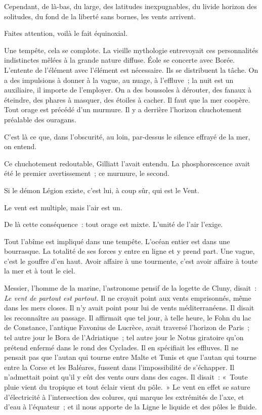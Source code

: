 \documentclass[french,twoside]{book} %
\begin{document}
Cependant, de là-bas, du large, des latitudes inexpugnables, du livide horizon des solitudes, du fond de la liberté sans bornes, les vents arrivent.\par
Faites attention, voilà le fait équinoxial.\par
Une tempête, cela se complote. La vieille mythologie entrevoyait ces personnalités indistinctes mêlées à la grande nature diffuse. Éole se concerte avec Borée.  L’entente de l’élément avec l’élément est nécessaire. Ils se distribuent la tâche. On a des impulsions à donner à la vague, au nuage, à l’effluve ; la nuit est un auxiliaire, il importe de l’employer. On a des boussoles à dérouter, des fanaux à éteindre, des phares à masquer, des étoiles à cacher. Il faut que la mer coopère. Tout orage est précédé d’un murmure. Il y a derrière l’horizon chuchotement préalable des ouragans.\par
C’est là ce que, dans l’obscurité, au loin, par-dessus le silence effrayé de la mer, on entend.\par
Ce chuchotement redoutable, Gilliatt l’avait entendu. La phosphorescence avait été le premier avertissement ; ce murmure, le second.\par
Si le démon Légion existe, c’est lui, à coup sûr, qui est le Vent.\par
Le vent est multiple, mais l’air est un.\par
De là cette conséquence : tout orage est mixte. L’unité de l’air l’exige.\par
Tout l’abîme est impliqué dans une tempête. L’océan entier est dans une bourrasque. La totalité de ses forces y entre en ligne et y prend part. Une vague, c’est le gouffre d’en haut. Avoir affaire à une tourmente, c’est avoir affaire à toute la mer et à tout le ciel.\par
Messier, l’homme de la marine, l’astronome pensif de la logette de Cluny, disait : \emph{Le vent de partout est partout.} Il ne croyait point aux vents emprisonnés, même dans les mers closes. Il n’y avait point pour lui de vents méditerranéens. Il disait les reconnaître au passage. Il affirmait que tel jour, à telle heure, le Fohn du  lac de Constance, l’antique Favonius de Lucrèce, avait traversé l’horizon de Paris ; tel autre jour le Bora de l’Adriatique ; tel autre jour le Notus giratoire qu’on prétend enfermé dans le rond des Cyclades. Il en spécifiait les effluves. Il ne pensait pas que l’autan qui tourne entre Malte et Tunis et que l’autan qui tourne entre la Corse et les Baléares, fussent dans l’impossibilité de s’échapper. Il n’admettait point qu’il y eût des vents ours dans des cages. Il disait : « Toute pluie vient du tropique et tout éclair vient du pôle. » Le vent en effet se sature d’électricité à l’intersection des colures, qui marque les extrémités de l’axe, et d’eau à l’équateur ; et il nous apporte de la Ligne le liquide et des pôles le fluide.\par
\end{document}
